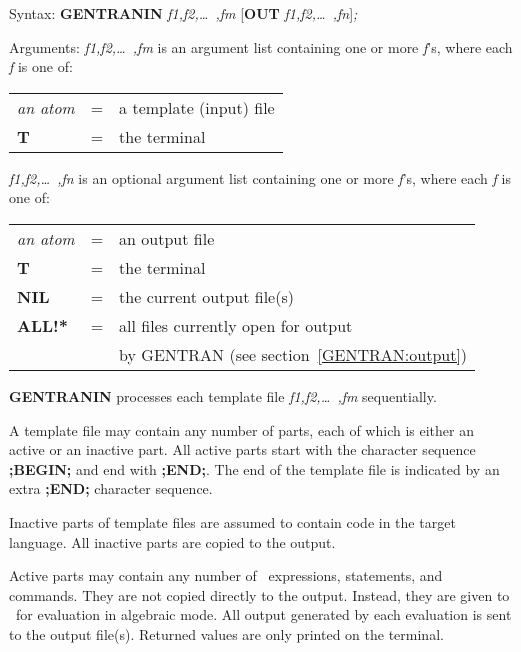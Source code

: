 \label{templates}
\begin{describe}{Syntax:}
{\bf GENTRANIN} {\it f1,f2,\dots\ ,fm} [{\bf OUT} {\it f1,f2,\dots\
 ,fn\/}]{\it ;}
\end{describe}
\begin{describe}{Arguments:}
{\it f1,f2,\dots\ ,fm\/} is an argument list containing one or more
{\it f\/}'s,
where each {\it f\/} is one of:
\begin{center}
\begin{tabular}{lll}
{\it an atom}& = &a template (input) file\\
{\bf T}& = &the terminal\\
\end{tabular}
\end{center}
{\it f1,f2,\dots\ ,fn\/} is an optional argument list containing one or more
{\it f\/}'s, where each {\it f\/} is one of:
\begin{center}
\begin{tabular}{lll}
{\it an atom}& = &an output file\\
{\bf T}& = &the terminal\\
{\bf NIL}& = &the current output file(s)\\
{\bf ALL!*}& = &all files currently open for output \\
& &  by GENTRAN (see section~\ref{GENTRAN:output}) \\
\end{tabular}
\end{center}
\end{describe}
{\bf GENTRANIN} processes each template file {\it f1,f2,\dots\ ,fm}
sequentially.

A template file may contain any number of parts, each of which
is either an active or an inactive part.  All active parts start with
the character sequence {\bf ;BEGIN;} and end with {\bf ;END;}.  The end
of the template file is indicated by an extra {\bf ;END;} character
sequence.\index{;BEGIN; marker} \index{;END; marker}

Inactive parts of template files are assumed to contain code in the
target language.  All inactive parts are
copied to the output.

Active parts may contain any number of \REDUCE\ expressions, statements,
and commands.  They are not copied directly to the output.  Instead,
they are given to \REDUCE\ for evaluation in algebraic mode.  All output
generated by each evaluation is sent to the output file(s).  Returned
values are only printed on the terminal.

